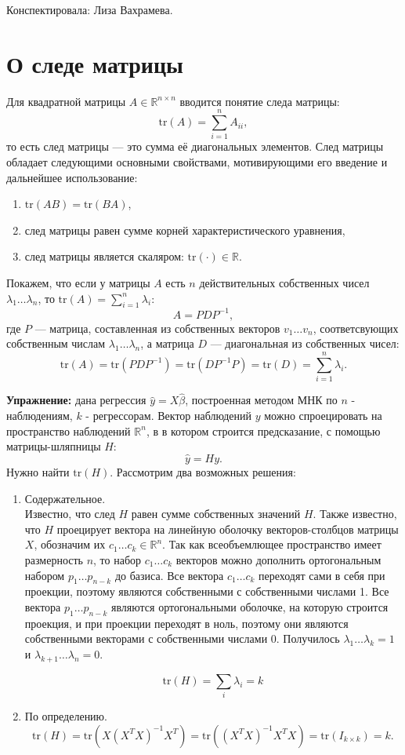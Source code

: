 \documentclass[12pt]{article} %
\theoremstyle{definition} %
\begin{document}
Конспектировала: Лиза Вахрамева.

\section{О следе матрицы}
Для квадратной матрицы $A \in \mathbb{R}^{n \times n}$ вводится понятие следа
матрицы:
$$\text{tr}(A) = \sum_{i=1}^n A_{ii},$$
то есть след матрицы — это сумма её диагональных элементов. След матрицы обладает следующими основными свойствами, мотивирующими его введение и дальнейшее использование:
\begin{enumerate}
    \item $\text{tr}(AB) = \text{tr}(BA)$,
    \item след матрицы равен сумме корней характеристического уравнения,\\
    \item след матрицы является скаляром: $\text{tr}(\cdot) \in \mathbb{R}$.
\end{enumerate}
Покажем, что если у матрицы $A$ есть $n$ действительных собственных чисел
$\lambda_1 \dots \lambda_n$, то $\text{tr}(A) = \sum_{i=1}^n \lambda_i$:
$$A = PDP^{-1},$$
где $P$ — матрица, составленная из собственных векторов $v_1 \dots v_n$, соответсвующих собственным числам $\lambda_1 \dots \lambda_n$, а матрица
$D$ — диагональная из собственных чисел:
$$\text{tr}(A) = \text{tr}(PDP^{-1}) = \text{tr}(D P^{-1} P)
= \text{tr}(D) = \sum_{i=1}^n \lambda_i.$$

\textbf{Упражнение:} дана регрессия $\hat{y} = X\hat{\beta}$, построенная методом МНК по $n$ - наблюдениям, $k$ - регрессорам. Вектор наблюдений $y$ можно спроецировать на пространство наблюдений $\mathbb{R}^n$, в в котором строится предсказание, с помощью матрицы-шляпницы $H$:
$$\hat{y} = Hy.$$
Нужно найти $\text{tr}(H)$. Рассмотрим два возможных решения:
\begin{enumerate}
    \item Содержательное. \\
    Известно, что след $H$ равен сумме собственных значений $H$. Также известно, что  $H$ проецирует вектора на линейную оболочку векторов-столбцов матрицы $X$, обозначим их $c_1 \dots c_k \in \mathbb{R}^n$. Так как всеобъемлющее пространство имеет размерность $n$, то набор $c_1 \dots c_k$ векторов можно дополнить ортогональным набором $p_1 \dots p_{n-k}$ до базиса. Все вектора $c_1 \dots c_k$ переходят сами в себя при проекции, поэтому являются собственными с собственными числами 1. Все вектора $p_1 \dots p_{n-k}$
    являются ортогональными оболочке, на которую строится проекция, и при проекции переходят в ноль, поэтому они являются собственными векторами с собственными числами 0. Получилось $\lambda_1 \dots \lambda_k = 1$ и $\lambda_{k+1} \dots \lambda_n = 0$.

    $$\text{tr}(H) = \sum_i \lambda_i = k$$

    \item По определению.
    $$ \text{tr}(H) = \text{tr} (X(X^TX)^{-1}X^T) =
      \text{tr} ((X^TX)^{-1} X^TX) = \text{tr} (I_{k \times k}) = k.$$
\end{enumerate}
\end{document}
